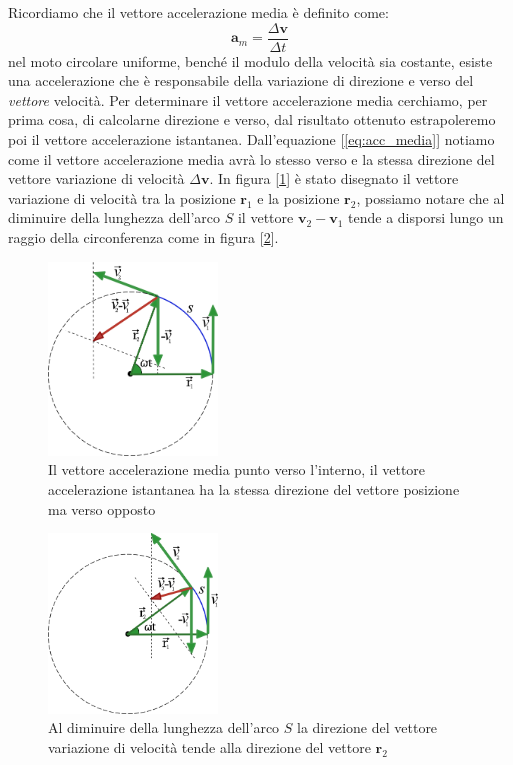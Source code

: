 \documentclass[a4paper,10pt,oneside]{article}
\begin{document}
Ricordiamo che il vettore accelerazione media è definito come:
\begin{equation}\label{eq:acc_media}
 \mathbf{a}_m=\frac{\Delta \mathbf{v}}{\Delta t}
\end{equation}
nel moto circolare uniforme, benché il modulo della velocità sia costante, esiste una accelerazione che è responsabile della variazione di direzione e verso del \emph{vettore} velocità. Per determinare il  vettore accelerazione  media cerchiamo, per prima cosa, di calcolarne direzione e verso, dal risultato ottenuto  estrapoleremo poi il vettore accelerazione istantanea.
Dall'equazione [\ref{eq:acc_media}] notiamo come il vettore accelerazione media avrà lo stesso verso e la stessa direzione del vettore variazione di velocità $\Delta \mathbf v$. In figura [\ref{fig:accel1}] è stato disegnato il vettore variazione di velocità tra la posizione $\mathbf{r}_1$ e la posizione $\mathbf{r}_2$, possiamo notare che al diminuire  della lunghezza dell'arco $S$ il vettore $\mathbf{v}_2 -\mathbf{v}_1$ tende a disporsi lungo un raggio della circonferenza come in figura [\ref{fig:acce2}].
\begin{figure}[H]
\begin{center}
 \includegraphics[width=0.4\textwidth]{./immagini/vet_acce.png}
 \caption{Il vettore accelerazione media punto verso l'interno, il vettore accelerazione istantanea ha la stessa direzione del vettore posizione ma verso opposto}
 \label{fig:accel1}
\end{center}
\end{figure}
\begin{figure}[H]
 \centering
 \includegraphics[width=0.4\textwidth]{./immagini/vet_acce2.png}
 \caption{Al diminuire della lunghezza dell'arco $S$ la direzione del vettore variazione di velocità tende alla direzione del vettore $\mathbf{r}_2$}
 \label{fig:acce2}
\end{figure}
\end{document}
